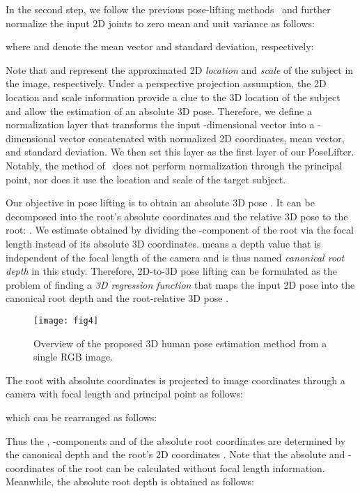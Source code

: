\documentclass[10pt,twocolumn,letterpaper]{article}
\begin{document}
In the second step, we follow the previous pose-lifting methods~\cite{Martinez2017} and further normalize the input 2D joints to zero mean and unit variance as follows:

where  and  denote the mean vector and standard deviation, respectively:


Note that  and  represent the approximated 2D \textit{location} and \textit{scale} of the subject in the image, respectively. Under a perspective projection assumption, the 2D location and scale information provide a clue to the 3D location of the subject and allow the estimation of an absolute 3D pose. Therefore, we define a normalization layer that transforms the input -dimensional vector  into a -dimensional vector concatenated with normalized 2D coordinates, mean vector, and standard deviation. We then set this layer as the first layer of our PoseLifter. Notably, the method of~\cite{Martinez2017} does not perform normalization through the principal point, nor does it use the location and scale of the target subject.

Our objective in pose lifting is to obtain an absolute 3D pose . It can be decomposed into the root's absolute coordinates  and the relative 3D pose  to the root: . We estimate  obtained by dividing the -component  of the root via the focal length  instead of its absolute 3D coordinates.  means a depth value that is independent of the focal length of the camera and is thus named \textit{canonical root depth} in this study. Therefore, 2D-to-3D pose lifting can be formulated as the problem of finding a \textit{3D regression function}  that maps the input 2D pose  into the canonical root depth  and the root-relative 3D pose .

\begin{figure*}[t]
\centering
\texttt{[image: fig4]}
\caption{Overview of the proposed 3D human pose estimation method from a single RGB image.}
\label{fig4}
\end{figure*}

The root with absolute coordinates  is projected to image coordinates  through a camera with focal length  and principal point  as follows:

which can be rearranged as follows:

Thus the , -components  and  of the absolute root coordinates are determined by the canonical depth  and the root's 2D coordinates . Note that the absolute  and -coordinates of the root can be calculated without focal length information. Meanwhile, the absolute root depth  is obtained as follows:
\end{document}
